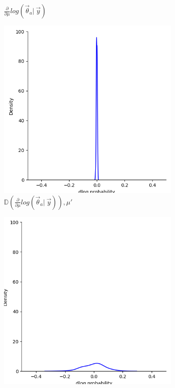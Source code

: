 \begin{figure}[H]
\begin{subfigure}{0.475\textwidth}
        \caption[]{$\frac{\partial}{\partial\mu} log(\vec{\theta}_a |\ \vec{y})$}
    \end{subfigure}
    \caption[Score functions of the log-likelihood of observations over $-20<x<20$]{}
    \label{fig:scorefunctions}
\end{figure}
\begin{figure}[H]
    \centering
    \begin{subfigure}{0.475\textwidth}
        \includegraphics[width=\textwidth]{figs/deriv_dist_10.png}
        \caption[]{$\mathbb{D}\left(\frac{\partial}{\partial\mu} log(\vec{\theta}_a |\ \vec{y})\right), \mu'$}
    \end{subfigure}
    \begin{subfigure}{0.475\textwidth}
        \includegraphics[width=\textwidth]{figs/deriv_dist_0.5.png}

\end{subfigure}
\end{figure}
